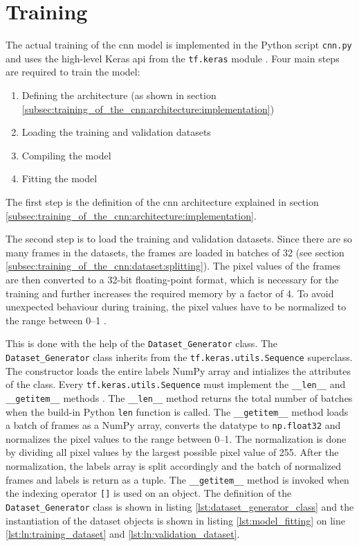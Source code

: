 \section{Training}
\label{sec:training_of_the_cnn:training}

The actual training of the \acrlong{cnn} model is implemented in the Python script \texttt{cnn.py} and uses the high-level Keras \acrshort{api} from the \texttt{tf.keras} module \cite{training_arch_tf_keras}.
Four main steps are required to train the model:

\begin{enumerate}
  \item Defining the architecture (as shown in section \ref{subsec:training_of_the_cnn:architecture:implementation})
  \item Loading the training and validation datasets
  \item Compiling the model
  \item Fitting the model
\end{enumerate}

The first step is the definition of the \acrshort{cnn} architecture explained in section \ref{subsec:training_of_the_cnn:architecture:implementation}.

The second step is to load the training and validation datasets.
Since there are so many frames in the datasets, the frames are loaded in batches of \num{32} (see section \ref{subsec:training_of_the_cnn:dataset:splitting}).
The pixel values of the frames are then converted to a 32-bit floating-point format, which is necessary for the training and further increases the required memory by a factor of \num{4}.
To avoid unexpected behaviour during training, the pixel values have to be normalized to the range between \numrange{0}{1} \cite{training_train_scaling}.

This is done with the help of the \texttt{Dataset\_Generator} class.
The \texttt{Dataset\_Generator} class inherits from the \texttt{tf.keras.utils.Sequence} superclass.
The constructor loads the entire labels NumPy array and intializes the attributes of the class.
Every \texttt{tf.keras.utils.Sequence} must implement the \texttt{\_\_len\_\_} and \texttt{\_\_getitem\_\_} methods \cite{training_arch_tf_keras_sequence}.
The \texttt{\_\_len\_\_} method returns the total number of batches when the build-in Python \texttt{len} function is called.
The \texttt{\_\_getitem\_\_} method loads a batch of frames as a NumPy array, converts the datatype to \texttt{np.float32} and normalizes the pixel values to the range between \numrange{0}{1}.
The normalization is done by dividing all pixel values by the largest possible pixel value of \num{255}.
After the normalization, the labels array is split accordingly and the batch of normalized frames and labels is return as a tuple.
The \texttt{\_\_getitem\_\_} method is invoked when the indexing operator \texttt{[]} is used on an object.
The definition of the \texttt{Dataset\_Generator} class is shown in listing \ref{lst:dataset_generator_class} and the instantiation of the dataset objects is shown in listing \ref{lst:model_fitting} on line \ref{lst:ln:training_dataset} and \ref{lst:ln:validation_dataset}.

